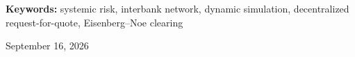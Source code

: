 \par
\noindent\textbf{Keywords:} systemic risk, interbank network, dynamic simulation,
decentralized request-for-quote, \mbox{Eisenberg--Noe} clearing

\par
\vspace{0.5em}

\begin{flushright}
\fontsize{10.5pt}{15pt}\selectfont
September 16, 2026
\end{flushright}

\endgroup
\endgroup

\clearpage
\begingroup
{}
\setlength{\emergencystretch}{3em}
\tableofcontents
\endgroup
\clearpage
